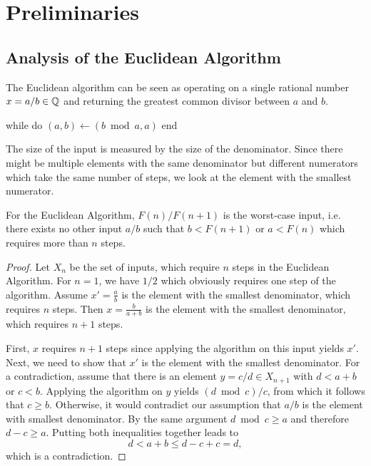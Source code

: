 \chapter{Preliminaries}

\section{Analysis of the Euclidean Algorithm}

The Euclidean algorithm can be seen as operating on a single rational number $x
= a/b \in {\mathbb Q}$ and returning the greatest common divisor between $a$ and $b$.

\begin{Pseudocode}
while  do
  $(a, b) \gets (b \bmod a, a)$
end
\end{Pseudocode}

The size of the input is measured by the size of the denominator.
Since there might be multiple elements with the same denominator but different
numerators which take the same number of steps, we look at the element
with the smallest numerator.

\begin{lemma}
  For the Euclidean Algorithm, $F(n) / F(n+1)$ is the worst-case input,
  i.e. there exists no other input $a / b$ such that $b < F(n + 1)$ or
  $a < F(n)$ which requires more than $n$ steps.
\end{lemma}

\begin{proof}
  Let $X_n$ be the set of inputs, which require $n$ steps in the Euclidean Algorithm.
  For $n = 1$, we have $1/2$ which obviously requires one step of the algorithm.
  Assume $x' = \frac{a}{b}$ is the element with the smallest denominator, which
  requires $n$ steps.
  Then $x = \frac{b}{a+b}$ is the element with the smallest denominator,
  which requires $n + 1$ steps.

  First, $x$ requires $n + 1$ steps since applying the algorithm on this input
  yields $x'$.
  Next, we need to show that $x'$ is the element with the smallest denominator.
  For a contradiction, assume that there is an element $y = c/d \in X_{n+1}$
  with $d < a + b$ or $c < b$.
  Applying the algorithm on $y$ yields $(d \bmod c) / c$,
  from which it follows that $c \ge b$.
  Otherwise, it would contradict our assumption that $a/b$ is the element with
  smallest denominator.
  By the same argument $d \bmod c \ge a$ and therefore $d - c \ge a$.
  Putting both inequalities together leads to
  \[
    d < a + b \le d - c + c = d,
  \]
  which is a contradiction.
\end{proof}

